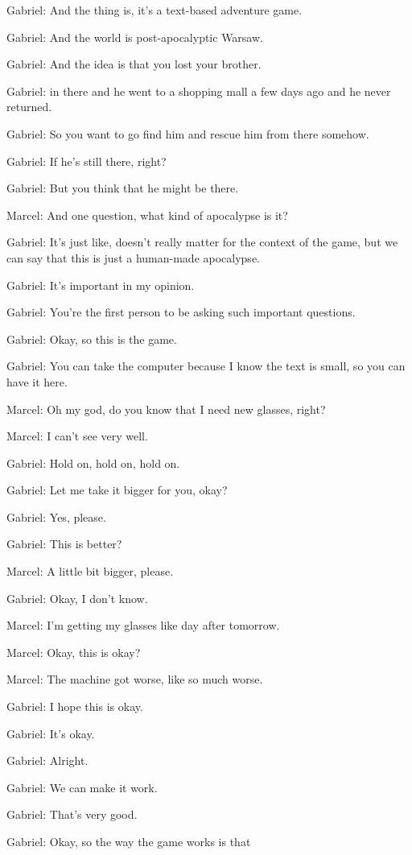 Gabriel: And the thing is, it's a text-based adventure game.

Gabriel: And the world is post-apocalyptic Warsaw.

Gabriel: And the idea is that you lost your brother.

Gabriel: in there and he went to a shopping mall a few days ago and he never returned.

Gabriel: So you want to go find him and rescue him from there somehow.

Gabriel: If he's still there, right?

Gabriel: But you think that he might be there.

Marcel: And one question, what kind of apocalypse is it?

Gabriel: It's just like, doesn't really matter for the context of the game, but we can say that this is just a human-made apocalypse.

Gabriel: It's important in my opinion.

Gabriel: You're the first person to be asking such important questions.

Gabriel: Okay, so this is the game.

Gabriel: You can take the computer because I know the text is small, so you can have it here.

Marcel: Oh my god, do you know that I need new glasses, right?

Marcel: I can't see very well.

Gabriel: Hold on, hold on, hold on.

Gabriel: Let me take it bigger for you, okay?

Gabriel: Yes, please.

Gabriel: This is better?

Marcel: A little bit bigger, please.

Gabriel: Okay, I don't know.

Marcel: I'm getting my glasses like day after tomorrow.

Marcel: Okay, this is okay?

Marcel: The machine got worse, like so much worse.

Gabriel: I hope this is okay.

Gabriel: It's okay.

Gabriel: Alright.

Gabriel: We can make it work.

Gabriel: That's very good.

Gabriel: Okay, so the way the game works is that

